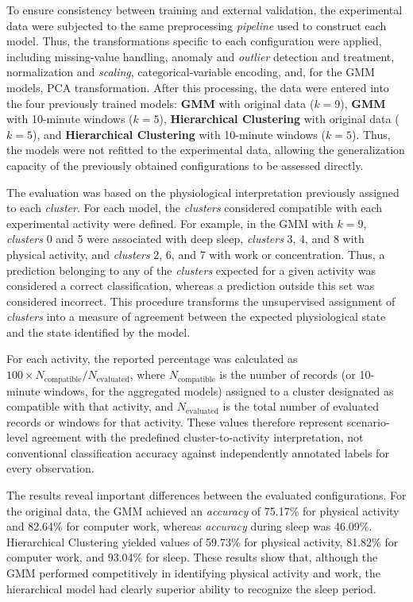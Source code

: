 \documentclass[a4paper,fleqn]{cas-sc}
\newcommand{\newtextred}[1]{{\color{yellow!65!black}#1}}
\begin{document}
To ensure consistency between training and external validation, the experimental data were subjected to the same preprocessing \textit{pipeline} used to construct each model. Thus, the transformations specific to each configuration were applied, including missing-value handling, anomaly and \textit{outlier} detection and treatment, normalization and \textit{scaling}, categorical-variable encoding, and, for the GMM models, PCA transformation. After this processing, the data were entered into the four previously trained models: \textbf{GMM} with original data ($k=9$), \textbf{GMM} with 10-minute windows ($k=5$), \textbf{Hierarchical Clustering} with original data ($k=5$), and \textbf{Hierarchical Clustering} with 10-minute windows ($k=5$). Thus, the models were not refitted to the experimental data, allowing the generalization capacity of the previously obtained configurations to be assessed directly.

The evaluation was based on the physiological interpretation previously assigned to each \textit{cluster}. For each model, the \textit{clusters} considered compatible with each experimental activity were defined. For example, in the GMM with $k=9$, \textit{clusters} 0 and 5 were associated with deep sleep, \textit{clusters} 3, 4, and 8 with physical activity, and \textit{clusters} 2, 6, and 7 with work or concentration. Thus, a prediction belonging to any of the \textit{clusters} expected for a given activity was considered a correct classification, whereas a prediction outside this set was considered incorrect. This procedure transforms the unsupervised assignment of \textit{clusters} into a measure of agreement between the expected physiological state and the state identified by the model.

\newtextred{For each activity, the reported percentage was calculated as $100 \times N_{\mathrm{compatible}}/N_{\mathrm{evaluated}}$, where $N_{\mathrm{compatible}}$ is the number of records (or 10-minute windows, for the aggregated models) assigned to a cluster designated as compatible with that activity, and $N_{\mathrm{evaluated}}$ is the total number of evaluated records or windows for that activity. These values therefore represent scenario-level agreement with the predefined cluster-to-activity interpretation, not conventional classification accuracy against independently annotated labels for every observation.}

The results reveal important differences between the evaluated configurations. For the original data, the GMM achieved an \textit{accuracy} of 75.17\% for physical activity and 82.64\% for computer work, whereas \textit{accuracy} during sleep was 46.09\%. Hierarchical Clustering yielded values of 59.73\% for physical activity, 81.82\% for computer work, and 93.04\% for sleep. These results show that, although the GMM performed competitively in identifying physical activity and work, the hierarchical model had clearly superior ability to recognize the sleep period.
\end{document}
